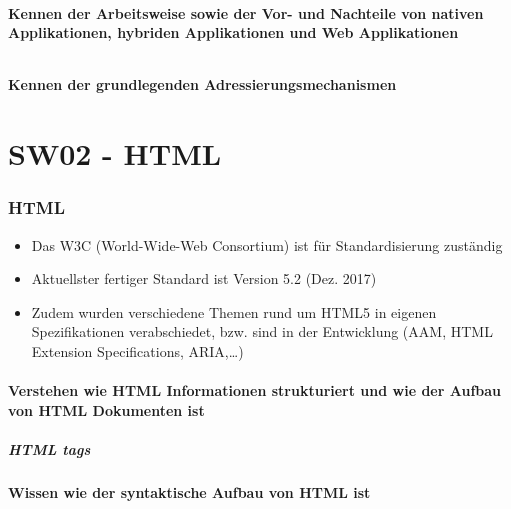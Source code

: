 \documentclass[10pt,a4paper]{article}
\begin{document}
\subsection{Kennen der Arbeitsweise sowie der Vor- und Nachteile von nativen Applikationen, hybriden Applikationen und Web Applikationen}
\paragraph*{}

\subsection{Kennen der grundlegenden Adressierungsmechanismen}
\paragraph*{}

\part{SW02 - HTML}
\section{HTML}
\begin{itemize}[noitemsep,topsep=0pt,leftmargin=*]
    \item Das W3C (World-Wide-Web Consortium) ist für Standardisierung zuständig
    \item Aktuellster fertiger Standard ist Version 5.2 (Dez. 2017)
    \item Zudem wurden verschiedene Themen rund um HTML5 in eigenen Spezifikationen verabschiedet, bzw. sind in der Entwicklung (AAM, HTML Extension Specifications, ARIA,\dots)
\end{itemize}
\subsection{Verstehen wie HTML Informationen strukturiert und wie der Aufbau von HTML Dokumenten ist}
\subsubsection{HTML tags}

\subsection{Wissen wie der \textbf{syntaktische Aufbau} von HTML ist}
\end{document}
